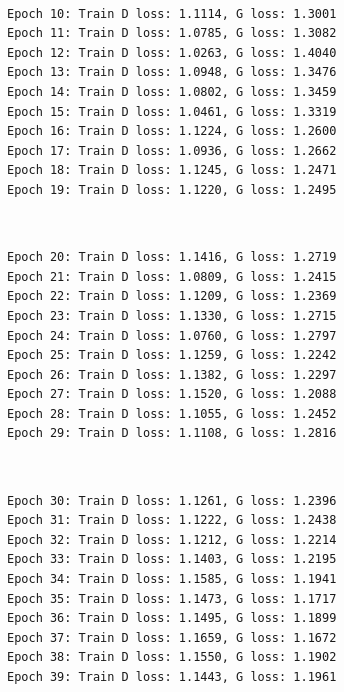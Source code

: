 \documentclass[11pt]{article}
\begin{document}
    \begin{center}
    \end{center}
    { \hspace*{\fill} \\}
    
    \begin{Verbatim}[commandchars=\\\{\}]
Epoch 10: Train D loss: 1.1114, G loss: 1.3001
Epoch 11: Train D loss: 1.0785, G loss: 1.3082
Epoch 12: Train D loss: 1.0263, G loss: 1.4040
Epoch 13: Train D loss: 1.0948, G loss: 1.3476
Epoch 14: Train D loss: 1.0802, G loss: 1.3459
Epoch 15: Train D loss: 1.0461, G loss: 1.3319
Epoch 16: Train D loss: 1.1224, G loss: 1.2600
Epoch 17: Train D loss: 1.0936, G loss: 1.2662
Epoch 18: Train D loss: 1.1245, G loss: 1.2471
Epoch 19: Train D loss: 1.1220, G loss: 1.2495

    \end{Verbatim}

    \begin{center}
    \end{center}
    { \hspace*{\fill} \\}
    
    \begin{Verbatim}[commandchars=\\\{\}]
Epoch 20: Train D loss: 1.1416, G loss: 1.2719
Epoch 21: Train D loss: 1.0809, G loss: 1.2415
Epoch 22: Train D loss: 1.1209, G loss: 1.2369
Epoch 23: Train D loss: 1.1330, G loss: 1.2715
Epoch 24: Train D loss: 1.0760, G loss: 1.2797
Epoch 25: Train D loss: 1.1259, G loss: 1.2242
Epoch 26: Train D loss: 1.1382, G loss: 1.2297
Epoch 27: Train D loss: 1.1520, G loss: 1.2088
Epoch 28: Train D loss: 1.1055, G loss: 1.2452
Epoch 29: Train D loss: 1.1108, G loss: 1.2816

    \end{Verbatim}

    \begin{center}
    \end{center}
    { \hspace*{\fill} \\}
    
    \begin{Verbatim}[commandchars=\\\{\}]
Epoch 30: Train D loss: 1.1261, G loss: 1.2396
Epoch 31: Train D loss: 1.1222, G loss: 1.2438
Epoch 32: Train D loss: 1.1212, G loss: 1.2214
Epoch 33: Train D loss: 1.1403, G loss: 1.2195
Epoch 34: Train D loss: 1.1585, G loss: 1.1941
Epoch 35: Train D loss: 1.1473, G loss: 1.1717
Epoch 36: Train D loss: 1.1495, G loss: 1.1899
Epoch 37: Train D loss: 1.1659, G loss: 1.1672
Epoch 38: Train D loss: 1.1550, G loss: 1.1902
Epoch 39: Train D loss: 1.1443, G loss: 1.1961

    \end{Verbatim}
\end{document}
